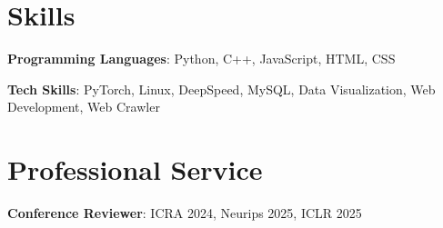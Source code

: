 \documentclass{chicv}
\begin{document}
% 

\section{Skills}

\begin{compactlist}
	\item \textbf{Programming Languages}: Python, C++, JavaScript, HTML, CSS
	\item \textbf{Tech Skills}: PyTorch, Linux, DeepSpeed, MySQL, Data Visualization, Web Development, Web Crawler
\end{compactlist}

\section{Professional Service}

\begin{compactlist}
	\item \textbf{Conference Reviewer}: ICRA 2024, Neurips 2025, ICLR 2025
\end{compactlist}
\end{document}
